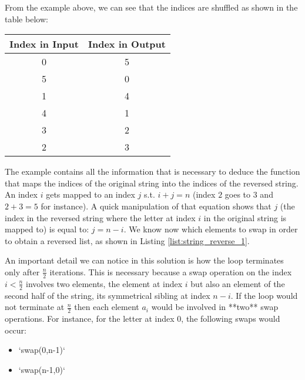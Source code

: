 From the example above, we can see that the indices are shuffled as shown in the table below:

\begin{table}[]
	\centering
	\begin{tabular}{|c|c|}
		\hline
		\multicolumn{1}{|l|}{Index in Input} & \multicolumn{1}{l|}{Index in Output} \\ \hline
		0                                    & 5                                    \\ \hline
		5                                    & 0                                    \\ \hline
		1                                    & 4                                    \\ \hline
		4                                    & 1                                    \\ \hline
		3                                    & 2                                    \\ \hline
		2                                    & 3                                    \\ \hline
	\end{tabular}
\end{table}

The example contains all the information that is necessary to deduce the function that maps the
indices of the original string into the indices of the reversed string. An index $i$ gets mapped to
an index $j$ s.t. $i+j = n$ (index $2$ goes to $3$ and $2+3=5$ for instance).
A quick manipulation of that equation shows
that $j$ (the index in the reversed string where the letter at index $i$ in the original string is mapped to)
is equal to: $j = n-i$. We know now which elements to swap in order to obtain a reversed list, as shown in Listing \ref{list:string_reverse_1}.





An important detail we can notice in this solution is how the loop terminates only after $\frac{n}{2}$ iterations.
This is necessary because a swap operation on the index $i<\frac{n}{2}$ involves two elements, the element at index $i$ but also an element of the second half of the string, its symmetrical sibling at index $n-i$.
If the loop would not terminate at $\frac{n}{2}$ then each element $a_i$ would be involved in **two** swap operations. 
For instance, for the letter at index $0$, the following swaps would occur:
\begin{itemize}
	\item `swap(0,n-1)`
	\item `swap(n-1,0)`
\end{itemize}


